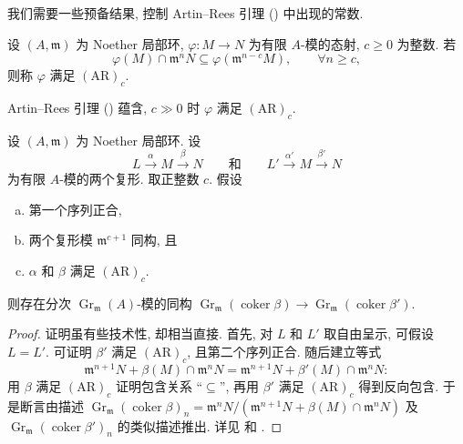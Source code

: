 我们需要一些预备结果, 控制 Artin--Rees 引理 () 中出现的常数.
\begin{definition}\label{src:C.6.3}
设 $(A,\mathfrak m)$ 为 Noether 局部环, $\varphi:M\to N$ 为有限 $A$-模的态射, $c\geq0$ 为整数. 若
\[
\varphi(M)\cap\mathfrak m^nN\subseteq\varphi(\mathfrak m^{n-c}M),\qquad\forall n\geq c,
\]
则称 $\varphi$ 满足 $(\mathrm{AR})_c$.
\end{definition}
Artin--Rees 引理 () 蕴含, $c\gg0$ 时 $\varphi$ 满足 $(\mathrm{AR})_c$.
\begin{lemma}\label{src:C.6.4}
设 $(A,\mathfrak m)$ 为 Noether 局部环. 设
\[
L\xrightarrow\alpha M\xrightarrow\beta N\qquad\text{和}\qquad L'\xrightarrow{\alpha'}M\xrightarrow{\beta'}N
\]
为有限 $A$-模的两个复形. 取正整数 $c$. 假设
\begin{enumerate}[(a)]
\item 第一个序列正合,
\item 两个复形模 $\mathfrak m^{c+1}$ 同构, 且
\item $\alpha$ 和 $\beta$ 满足 $(\mathrm{AR})_c$.
\end{enumerate}
则存在分次 $\operatorname{Gr}_{\mathfrak m}(A)$-模的同构 $\operatorname{Gr}_{\mathfrak m}(\operatorname{coker}\beta)\to\operatorname{Gr}_{\mathfrak m}(\operatorname{coker}\beta')$.
\end{lemma}
\begin{proof}
证明虽有些技术性, 却相当直接. 首先, 对 $L$ 和 $L'$ 取自由呈示, 可假设 $L=L'$. 可证明 $\beta'$ 满足 $(\mathrm{AR})_c$, 且第二个序列正合. 随后建立等式
\[
\mathfrak m^{n+1}N+\beta(M)\cap\mathfrak m^nN=\mathfrak m^{n+1}N+\beta'(M)\cap\mathfrak m^nN:
\]
用 $\beta$ 满足 $(\mathrm{AR})_c$ 证明包含关系 ``$\subseteq$'', 再用 $\beta'$ 满足 $(\mathrm{AR})_c$ 得到反向包含. 于是断言由描述 $\operatorname{Gr}_{\mathfrak m}(\operatorname{coker}\beta)_n=\mathfrak m^nN/(\mathfrak m^{n+1}N+\beta(M)\cap\mathfrak m^nN)$ 及 $\operatorname{Gr}_{\mathfrak m}(\operatorname{coker}\beta')_n$ 的类似描述推出. 详见 \cite[\S$3$]{CdJ02} 和 \cite[Tag 07VF]{SP}.
\end{proof}
